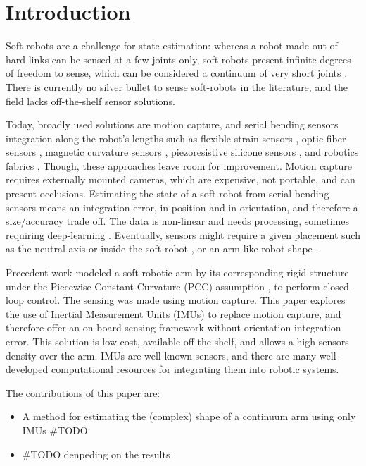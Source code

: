 \section{Introduction}  \label{sec:introduction}
Soft robots are a challenge for state-estimation: whereas a robot made out of hard links can be sensed at a few joints only, soft-robots present infinite degrees of freedom to sense, which can be considered a continuum of very short joints \cite{8913522}. There is currently no silver bullet to sense soft-robots in the literature, and the field lacks off-the-shelf sensor solutions. 

Today, broadly used solutions are motion capture, and serial bending sensors integration along the robot's lengths such as flexible strain sensors \cite{doi:10.1089/soro.2018.0162} \cite{8404920}, optic fiber sensors \cite{doi:10.1089/soro.2018.0131} \cite{ZHUANG20187}, magnetic curvature sensors \cite{doi:10.1089/soro.2016.0041}, piezoresistive silicone sensors \cite{9013033}, and robotics fabrics \cite{8405379} \cite{Yuen2017}. Though, these approaches leave room for improvement. Motion capture requires externally mounted cameras, which are expensive, not portable, and can present occlusions. Estimating the state of a soft robot from serial bending sensors means an integration error, in position and in orientation, and therefore a size/accuracy trade off. The data is non-linear and needs processing, sometimes requiring deep-learning \cite{doi:10.1089/soro.2018.0162} \cite{9013033} . Eventually, sensors might require a given placement such as the neutral axis \cite{doi:10.1089/soro.2016.0041} or inside the soft-robot \cite{doi:10.1089/soro.2018.0162}, or an arm-like robot shape \cite{Yuen2017}.

Precedent work modeled a soft robotic arm by its corresponding rigid structure under the Piecewise Constant-Curvature (PCC) assumption  \cite{8722799} \cite{doi:10.1177/0278364910368147}, to perform closed-loop control. The sensing was made using motion capture. This paper explores the use of Inertial Measurement Units (IMUs) to replace motion capture, and therefore offer an on-board sensing framework without orientation integration error. This solution is low-cost, available off-the-shelf, and allows a high sensors density over the arm. IMUs are well-known sensors, and there are many well-developed computational resources for integrating them into robotic systems.

The contributions of this paper are:
\begin{itemize}
    \item A method for estimating the (complex) shape of a continuum arm using only IMUs \#TODO
    \item \#TODO denpeding on the results
\end{itemize}

